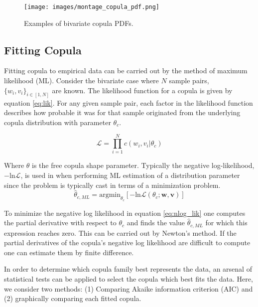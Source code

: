 \begin{figure}[!htbp]
	\centering
	\texttt{[image: images/montage\_copula\_pdf.png]}
	\caption{Examples of bivariate copula PDFs.}
	\label{fig:montage_cop}
\end{figure}

\subsection{Fitting Copula}
\label{sec:fitting_copula}

Fitting copula to empirical data can be carried out by the method of maximum likelihood (ML).  Consider the bivariate case where $N$ sample pairs, $\{w_i, v_i\}_{i\in [ 1,N ] }$  are known. The likelihood function for a copula is given by equation \ref{eq:lik}.  For any given sample pair, each factor in the likelihood function describes how probable it was for that sample originated from the underlying copula distribution with parameter $\theta_c$.

\begin{equation}
\mathcal{L}= \prod_{i=1}^N c(w_i, v_i|\theta_c)
\label{eq:lik}
\end{equation}

Where $\theta$ is the free copula shape parameter.
Typically the negative log-likelihood, $-\mathrm{ln}\mathcal{L}$, is used in when performing ML estimation of a distribution parameter since the problem is typically cast in terms of a minimization problem.  
\begin{equation}
\hat \theta_{c,ML} = \mathrm{argmin}_{\theta_c}[-\mathrm{ln}\mathcal{L}(\theta_{c} ; \mathbf w, \mathbf v)]
\label{eq:nlog_lik}
\end{equation}

To minimize the negative log likelihood in equation \ref{eq:nlog_lik}  one computes the partial derivative with respect to $\theta_c$ and finds the value $\hat \theta_{c,ML}$ for which this expression reaches zero.  This can be carried out by Newton's method.  If the partial derivatives of the copula's negative log likelihood are difficult to compute one can estimate them by finite difference. 

In order to determine which copula family best represents the data, an arsenal of statistical tests can be applied to select the copula which best fits the data.  Here, we consider two methods:  (1) Comparing Akaike information criterion (AIC) and (2) graphically comparing each fitted copula.  

